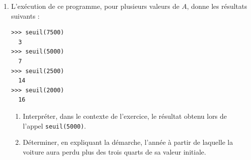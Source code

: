 \begin{enumerate}
	\item L'exécution de ce programme, pour plusieurs valeurs de $A$, donne les résultats suivants :

\begin{lstlisting}[style=python,xleftmargin=5cm,xrightmargin=5cm,numbers=none]
>>> seuil(7500)
  3
>>> seuil(5000)
  7
>>> seuil(2500)
  14
>>> seuil(2000)
  16
\end{lstlisting}

	\begin{enumerate}
		\item Interpréter, dans le contexte de l'exercice, le résultat obtenu lors de l'appel \texttt{seuil(5000)}.

		\item Déterminer, en expliquant la démarche, l'année à partir de laquelle la voiture aura perdu plus des trois quarts de sa valeur initiale.
	\end{enumerate}
\end{enumerate}
